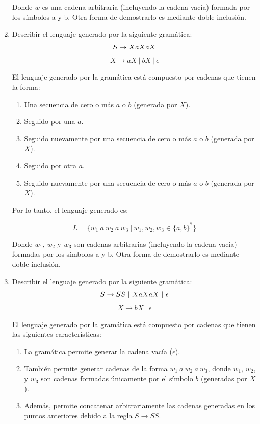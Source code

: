 \documentclass[12pt]{report} %
\begin{document}
\begin{enumerate}
\begin{solucion}[Ejercicio 1.b]
   Donde $w$ es una cadena arbitraria (incluyendo la cadena vacía) formada por los símbolos a y b. Otra forma de demostrarlo es mediante doble inclusión.

   \end{solucion}
\item
  Describir el lenguaje generado por la siguiente gramática: \[
   S \to XaXaX \\
   \] \[
   X \to aX \ | \ bX \ | \ \epsilon
   \]

  \begin{solucion}[Ejercicio 1.c]

   El lenguaje generado por la gramática está compuesto por cadenas que tienen la forma:

   \begin{enumerate}
       \item Una secuencia de cero o más $a$ o $b$ (generada por $X$).
       \item Seguido por una $a$.
       \item Seguido nuevamente por una secuencia de cero o más $a$ o $b$ (generada por $X$).
       \item Seguido por otra $a$.
       \item Seguido nuevamente por una secuencia de cero o más $a$ o $b$ (generada por $X$).
   \end{enumerate}

   Por lo tanto, el lenguaje generado es:

   $$
   L = \{ w_1 \ a \ w_2 \ a \ w_3  \ | \ w_1, w_2, w_3 \in \{a, b\}^* \}
   $$

   Donde $w_1$, $w_2$ y $w_3$ son cadenas arbitrarias (incluyendo la cadena vacía) formadas por los símbolos a y b. Otra forma de demostrarlo es mediante doble inclusión.

   \end{solucion}
\item
  Describir el lenguaje generado por la siguiente gramática: \[
   S \to SS \ | \ XaXaX \ | \ \epsilon \\
   \] \[
   X \to bX \ | \ \epsilon
   \]

  \begin{solucion}[Ejercicio 1.d]

   El lenguaje generado por la gramática está compuesto por cadenas que tienen las siguientes características:

   \begin{enumerate}
       \item La gramática permite generar la cadena vacía ($\epsilon$).
       \item También permite generar cadenas de la forma $w_1 \ a \ w_2 \ a \ w_3 $, donde $w_1$, $w_2$, y $w_3$ son cadenas formadas únicamente por el símbolo $b$ (generadas por $X$).
       \item Además, permite concatenar arbitrariamente las cadenas generadas en los puntos anteriores debido a la regla $S \to SS$.
   \end{enumerate}


\end{solucion}
\end{enumerate}
\end{document}
